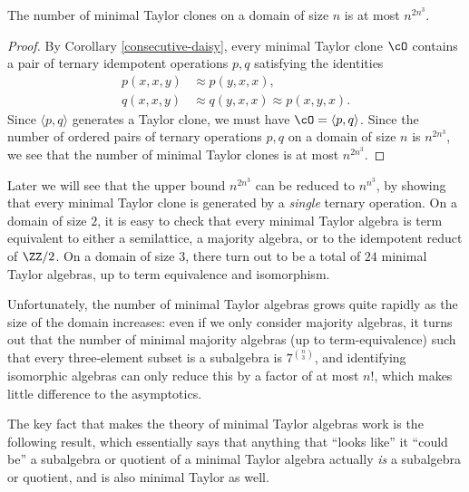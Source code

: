 \begin{prop} The number of minimal Taylor clones on a domain of size $n$ is at most $n^{2n^3}$.
\end{prop}
\begin{proof} By Corollary \ref{consecutive-daisy}, every minimal Taylor clone $\cO$ contains a pair of ternary idempotent operations $p,q$ satisfying the identities
\begin{align*}
p(x,x,y) &\approx p(y,x,x),\\
q(x,x,y) &\approx q(y,x,x) \approx p(x,y,x).
\end{align*}
Since $\langle p,q\rangle$ generates a Taylor clone, we must have $\cO = \langle p,q\rangle$. Since the number of ordered pairs of ternary operations $p,q$ on a domain of size $n$ is $n^{2n^3}$, we see that the number of minimal Taylor clones is at most $n^{2n^3}$.
\end{proof}

\begin{rem}
Later we will see that the upper bound $n^{2n^3}$ can be reduced to $n^{n^3}$, by showing that every minimal Taylor clone is generated by a \emph{single} ternary operation. On a domain of size $2$, it is easy to check that every minimal Taylor algebra is term equivalent to either a semilattice, a majority algebra, or to the idempotent reduct of $\ZZ/2$. On a domain of size $3$, there turn out to be a total of $24$ minimal Taylor algebras, up to term equivalence and isomorphism.

Unfortunately, the number of minimal Taylor algebras grows quite rapidly as the size of the domain increases: even if we only consider majority algebras, it turns out that the number of minimal majority algebras (up to term-equivalence) such that every three-element subset is a subalgebra is $7^{\binom{n}{3}}$, and identifying isomorphic algebras can only reduce this by a factor of at most $n!$, which makes little difference to the asymptotics.
\end{rem}

The key fact that makes the theory of minimal Taylor algebras work is the following result, which essentially says that anything that ``looks like'' it ``could be'' a subalgebra or quotient of a minimal Taylor algebra actually \emph{is} a subalgebra or quotient, and is also minimal Taylor as well.

